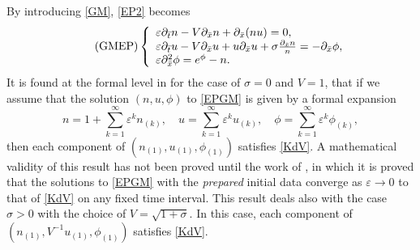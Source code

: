 \documentclass{amsart}
\newcommand{\veps}{\varepsilon}
\numberwithin{equation}{section}
\theoremstyle{plain}%
\theoremstyle{definition}
\theoremstyle{remark}
\theoremstyle{remark}
\begin{document}
By introducing \eqref{GM}, \eqref{EP2} becomes
\begin{equation}\tag{GMEP}\label{EPGM}
\left\{
\begin{array}{l l}
\veps\partial_{\bar{t}} n -V\partial_{\bar{x}}n +  \partial_{\bar{x}}(nu) = 0, \\ 
\veps\partial_{\bar{t}} u  - V\partial_{\bar{x}} u + u\partial_{\bar{x}} u + \sigma\frac{\partial_{\bar{x}} n}{n} = -\partial_{\bar{x}}\phi, \\
\veps\partial_{\bar{x}}^2\phi = e^\phi - n.
\end{array} 
\right.
\end{equation}
It is found at the formal level in \cite{Wa} for the case of $\sigma=0$ and $V=1$,  that if we assume that the solution $(n,u,\phi)$ to \eqref{EPGM} is given by a formal expansion 
\begin{equation}\label{FormalExpan}
n = 1 + \sum_{k=1}^\infty \veps^k n_{(k)}, \quad  
u = \sum_{k=1}^\infty \veps^k u_{(k)}, \quad 
\phi = \sum_{k=1}^\infty \veps^k \phi_{(k)},
\end{equation}
then each component of $(n_{(1)},u_{(1)},\phi_{(1)})$ satisfies \eqref{KdV}. A mathematical validity of this result has not been proved until the work of \cite{Guo}, in which    
  it is proved that the solutions to \eqref{EPGM} with the \emph{prepared} initial data converge as $\veps \to 0$ to that of \eqref{KdV} on any fixed time interval.
  This result deals also with the case $\sigma > 0$ with the choice of $V=\sqrt{1+\sigma}$. In this case, each component of $(n_{(1)}, V^{-1} u_{(1)} ,\phi_{(1)})$ satisfies \eqref{KdV}.
  
\end{document}
